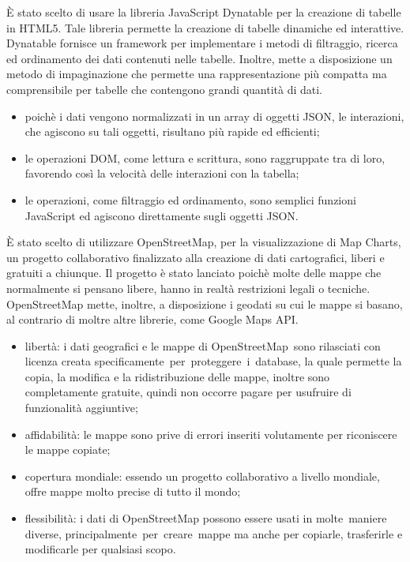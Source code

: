 È stato scelto di usare la libreria JavaScript Dynatable per la creazione di tabelle in HTML5. Tale libreria permette la creazione di tabelle dinamiche ed interattive. Dynatable fornisce un framework per implementare i metodi di filtraggio, ricerca ed ordinamento dei dati contenuti nelle tabelle. Inoltre, mette a disposizione un metodo di impaginazione che permette una rappresentazione più compatta ma comprensibile per tabelle che contengono grandi quantità di dati.
\begin{itemize}
\item poichè i dati vengono normalizzati in un array di oggetti JSON, le interazioni, che agiscono su tali oggetti, risultano più rapide ed efficienti;
\item le operazioni DOM, come lettura e scrittura, sono raggruppate tra di loro, favorendo così la velocità delle interazioni con la tabella;
\item le operazioni, come filtraggio ed ordinamento, sono semplici funzioni JavaScript ed agiscono direttamente sugli oggetti JSON.
\end{itemize}

È stato scelto di utilizzare OpenStreetMap, per la visualizzazione di Map Charts, un progetto collaborativo finalizzato alla creazione di dati cartografici, liberi e gratuiti a chiunque. Il progetto è stato lanciato poichè molte delle mappe che normalmente si pensano libere, hanno in realtà restrizioni legali o tecniche. OpenStreetMap mette, inoltre, a disposizione i geodati su cui le mappe si basano, al contrario di moltre altre librerie, come Google Maps API.
\begin{itemize}
\item libertà: i dati geografici e le mappe di OpenStreetMap sono rilasciati con licenza creata specificamente per proteggere i database, la quale permette la copia, la modifica e la ridistribuzione delle mappe, inoltre sono completamente gratuite, quindi non occorre pagare per usufruire di funzionalità aggiuntive;
\item affidabilità: le mappe sono prive di errori inseriti volutamente per riconiscere le mappe copiate;
\item copertura mondiale: essendo un progetto collaborativo a livello mondiale, offre mappe molto precise di tutto il mondo;
\item flessibilità: i dati di OpenStreetMap possono essere usati in molte maniere diverse, principalmente per creare mappe ma anche per copiarle, trasferirle e modificarle per qualsiasi scopo.
\end{itemize}

